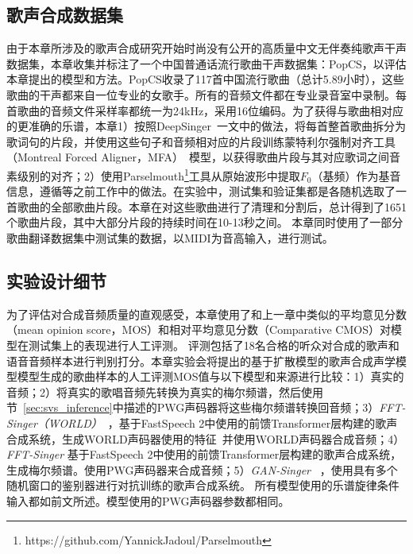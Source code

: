 \subsection{歌声合成数据集}
由于本章所涉及的歌声合成研究开始时尚没有公开的高质量中文无伴奏纯歌声干声数据集，本章收集并标注了一个中国普通话流行歌曲干声数据集：PopCS，以评估本章提出的模型和方法。PopCS收录了117首中国流行歌曲（总计5.89小时），这些歌曲的干声都来自一位专业的女歌手。所有的音频文件都在专业录音室中录制。每首歌曲的音频文件采样率都统一为24kHz，采用16位编码。为了获得与歌曲相对应的更准确的乐谱，本章1）按照DeepSinger~\citep{ren2020deepsinger}一文中的做法，将每首整首歌曲拆分为歌词句的片段，并使用这些句子和音频相对应的片段训练蒙特利尔强制对齐工具（Montreal Forced Aligner，MFA）~\citep{mcauliffe2017montreal}模型，以获得歌曲片段与其对应歌词之间音素级别的对齐；2）使用Parselmouth\footnote{https://github.com/YannickJadoul/Parselmouth}工具从原始波形中提取$F_0$（基频）作为基音信息，遵循\citet{wu2020adversarially,blaauw2020sequence,ren2020deepsinger}等之前工作中的做法。在实验中，测试集和验证集都是各随机选取了一首歌曲的全部歌曲片段。本章在对这些歌曲进行了清理和分割后，总计得到了1651个歌曲片段，其中大部分片段的持续时间在10-13秒之间。
本章同时使用了一部分歌曲翻译数据集中测试集的数据，以MIDI为音高输入，进行测试。
\subsection{实验设计细节}
为了评估对合成音频质量的直观感受，本章使用了和上一章中类似的平均意见分数（mean opinion score，MOS）和相对平均意见分数（Comparative CMOS）对模型在测试集上的表现进行人工评测。 评测包括了18名合格的听众对合成的歌声和语音音频样本进行判别打分。本章实验会将提出的基于扩散模型的歌声合成声学模型模型生成的歌曲样本的人工评测MOS值与以下模型和来源进行比较：1）真实的音频；2）将真实的歌唱音频先转换为真实的梅尔频谱，然后使用节~\ref{sec:svs_inference}中描述的PWG声码器将这些梅尔频谱转换回音频；3）\textit{FFT-Singer（WORLD）}~\citep{blaauw2020sequence}，基于FastSpeech 2中使用的前馈Transformer层构建的歌声合成系统，生成WORLD声码器使用的特征~\citep{morise2016world}并使用WORLD声码器合成音频；4）\textit{FFT-Singer} 基于FastSpeech 2中使用的前馈Transformer层构建的歌声合成系统，生成梅尔频谱。使用PWG声码器来合成音频；5）\textit{GAN-Singer}
~\citep{wu2020adversarially}，使用具有多个随机窗口的鉴别器进行对抗训练的歌声合成系统。
所有模型使用的乐谱旋律条件输入都如前文所述。模型使用的PWG声码器参数都相同。

